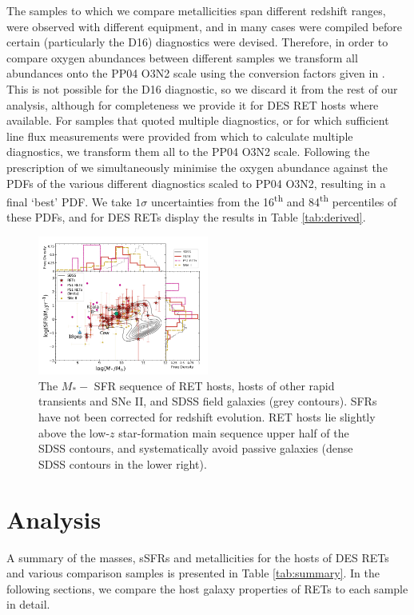 \documentclass[fleqn,usenatbib,]{mnras}
\begin{document}
The samples to which we compare metallicities span different redshift ranges, were observed with different equipment, and in many cases were compiled before certain (particularly the D16) diagnostics were devised. Therefore, in order to compare oxygen abundances between different samples we transform all abundances onto the PP04 O3N2 scale using the conversion factors given in \citet{Kewley2008}. This is not possible for the D16 diagnostic, so we discard it from the rest of our analysis, although for completeness we provide it for DES RET hosts where available. For samples that quoted multiple diagnostics, or for which sufficient line flux measurements were provided from which to calculate multiple diagnostics, we transform them all to the PP04 O3N2 scale. Following the prescription of \citet{Kruehler2015} we simultaneously minimise the oxygen abundance against the PDFs of the various different diagnostics scaled to PP04 O3N2, resulting in a final `best' PDF. We take $1\sigma$ uncertainties from the 16\textsuperscript{th} and 84\textsuperscript{th} percentiles of these PDFs, and for DES RETs display the results in Table \ref{tab:derived}.
\begin{figure}

\includegraphics[width=0.5\textwidth]{figs/SFR_Mike_RETs.png}
\caption{The $M_* -$ SFR sequence of RET hosts, hosts of other rapid transients and SNe II, and SDSS field galaxies (grey contours). SFRs have not been corrected for redshift evolution. RET hosts lie slightly above the low-$z$ star-formation main sequence upper half of the SDSS contours, and systematically avoid passive galaxies (dense SDSS contours in the lower right).
\label{fig:sfms_sfr}}
\end{figure}

\section{Analysis}
\label{sec:analysis} %
A summary of the masses, sSFRs and metallicities for the hosts of DES RETs and various comparison samples is presented in Table \ref{tab:summary}. In the following sections, we compare the host galaxy properties of RETs to each sample in detail.
\end{document}

